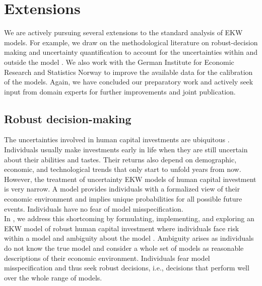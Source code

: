 \section{Extensions}\label{Extensions}
We are actively pursuing several extensions to the standard analysis of EKW models. For example, we draw on the methodological literature on robust-decision making and uncertainty quantification to account for the uncertainties within and outside the model \citep{Hansen.2015}. We also work with the German Institute for Economic Research and Statistics Norway to improve the available data for the calibration of the models. Again, we have concluded our preparatory work and actively seek input from domain experts for further improvements and joint publication.
\subsection{Robust decision-making}
The uncertainties involved in human capital investments are ubiquitous \citep{Becker.1964}. Individuals usually make investments early in life when they are still uncertain about their abilities and tastes. Their returns also depend on demographic, economic, and technological trends that only start to unfold years from now. However, the treatment of uncertainty EKW models of human capital investment is very narrow. A model provides individuals with a formalized view of their economic environment and implies unique probabilities for all possible future events. Individuals have no fear of model misspecification.\\

\noindent In \citet{Eisenhauer.2020}, we address this shortcoming by formulating, implementing, and exploring an EKW model of robust human capital investment where individuals face risk within a model and ambiguity about the model \citep{Arrow.1951}. Ambiguity arises as individuals do not know the true model and consider a whole set of models as reasonable descriptions of their economic environment. Individuals fear model misspecification and thus seek robust decisions, i.e., decisions that perform well over the whole range of models.\\

